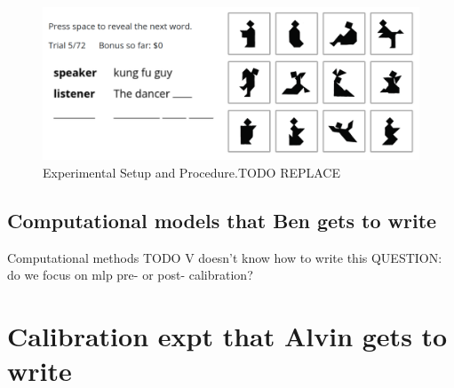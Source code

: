\documentclass[10pt, letterpaper]{article}
\begin{document}
\begin{CodeChunk}
\begin{figure}[t!]

{\centering \includegraphics[width=1\linewidth]{matcher_diagram} 

}

\caption[Experimental Setup and Procedure.TODO REPLACE \label{game}]{Experimental Setup and Procedure.TODO REPLACE \label{game}}\label{fig:interface}
\end{figure}
\end{CodeChunk}

\subsection{Computational models that Ben gets to
write}\label{computational-models-that-ben-gets-to-write}

Computational methods TODO V doesn't know how to write this QUESTION: do
we focus on mlp pre- or post- calibration?

\section{Calibration expt that Alvin gets to
write}\label{calibration-expt-that-alvin-gets-to-write}
\end{document}
